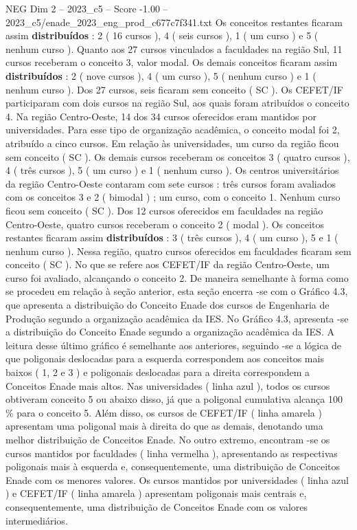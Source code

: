 \begin{textsample}{NEG Dim 2 – 2023\_c5 – Score -1.00 – 2023\_c5/enade\_2023\_eng\_prod\_c677c7f341.txt}
Os conceitos restantes ficaram assim \textbf{distribuídos} : 2 ( 16 cursos ), 4 ( seis cursos ), 1 ( um curso ) e 5 ( nenhum curso ).
Quanto aos 27 cursos vinculados a faculdades na região Sul, 11 cursos receberam o conceito 3, valor modal.
Os demais conceitos ficaram assim \textbf{distribuídos} : 2 ( nove cursos ), 4 ( um curso ), 5 ( nenhum curso ) e 1 ( nenhum curso ).
Dos 27 cursos, seis ficaram sem conceito ( SC ).
Os CEFET/IF participaram com dois cursos na região Sul, aos quais foram atribuídos o conceito 4.
Na região Centro-Oeste, 14 dos 34 cursos oferecidos eram mantidos por universidades.
Para esse tipo de organização acadêmica, o conceito modal foi 2, atribuído a cinco cursos.
Em relação às universidades, um curso da região ficou sem conceito ( SC ).
Os demais cursos receberam os conceitos 3 ( quatro cursos ), 4 ( três cursos ), 5 ( um curso ) e 1 ( nenhum curso ).
Os centros universitários da região Centro-Oeste contaram com sete cursos : três cursos foram avaliados com os conceitos 3 e 2 ( bimodal ) ; um curso, com o conceito 1.
Nenhum curso ficou sem conceito ( SC ).
Dos 12 cursos oferecidos em faculdades na região Centro-Oeste, quatro cursos receberam o conceito 2 ( modal ).
Os conceitos restantes ficaram assim \textbf{distribuídos} : 3 ( três cursos ), 4 ( um curso ), 5 e 1 ( nenhum curso ).
Nessa região, quatro cursos oferecidos em faculdades ficaram sem conceito ( SC ).
No que se refere aos CEFET/IF da região Centro-Oeste, um curso foi avaliado, alcançando o conceito 2.
De maneira semelhante à forma como se procedeu em relação à seção anterior, esta seção encerra -se com o Gráfico 4.3, que apresenta a distribuição do Conceito Enade dos cursos de Engenharia de Produção segundo a organização acadêmica da IES.
No Gráfico 4.3, apresenta -se a distribuição do Conceito Enade segundo a organização acadêmica da IES.
A leitura desse último gráfico é semelhante aos anteriores, seguindo -se a lógica de que poligonais deslocadas para a esquerda correspondem aos conceitos mais baixos ( 1, 2 e 3 ) e poligonais deslocadas para a direita correspondem a Conceitos Enade mais altos.
Nas universidades ( linha azul ), todos os cursos obtiveram conceito 5 ou abaixo disso, já que a poligonal cumulativa alcança 100 \% para o conceito 5.
Além disso, os cursos de CEFET/IF ( linha amarela ) apresentam uma poligonal mais à direita do que as demais, denotando uma melhor distribuição de Conceitos Enade.
No outro extremo, encontram -se os cursos mantidos por faculdades ( linha vermelha ), apresentando as respectivas poligonais mais à esquerda e, consequentemente, uma distribuição de Conceitos Enade com os menores valores.
Os cursos mantidos por universidades ( linha azul ) e CEFET/IF ( linha amarela ) apresentam poligonais mais centrais e, consequentemente, uma distribuição de Conceitos Enade com os valores intermediários.

\end{textsample}
